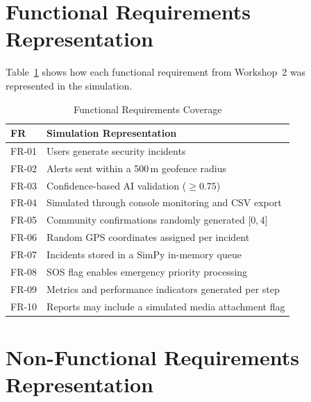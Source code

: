 \documentclass[conference,a4paper,10pt]{IEEEtran}
\begin{document}
\section{Functional Requirements Representation}

Table~\ref{tab:fr} shows how each functional requirement from
Workshop~2 was represented in the simulation.

\begin{table}[H]
\caption{Functional Requirements Coverage}
\label{tab:fr}\centering\small
\begin{tabular}{ll}
\toprule
\textbf{FR} & \textbf{Simulation Representation}\\
\midrule
FR-01 & Users generate security incidents\\
FR-02 & Alerts sent within a 500\,m geofence radius\\
FR-03 & Confidence-based AI validation ($\geq 0.75$)\\
FR-04 & Simulated through console monitoring and CSV export\\
FR-05 & Community confirmations randomly generated [0,\,4]\\
FR-06 & Random GPS coordinates assigned per incident\\
FR-07 & Incidents stored in a SimPy in-memory queue\\
FR-08 & SOS flag enables emergency priority processing\\
FR-09 & Metrics and performance indicators generated per step\\
FR-10 & Reports may include a simulated media attachment flag\\
\bottomrule
\end{tabular}
\end{table}

\section{Non-Functional Requirements Representation}
\end{document}
